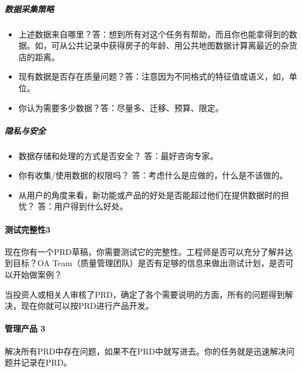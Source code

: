 \documentclass[letterpaper,11pt,english]{sphinxmanual}
\begin{document}
\subparagraph{数据采集策略}
\label{\detokenize{chapter_knowledge/PRD:id23}}\begin{itemize}
\item {} 
上述数据来自哪里？答：想到所有对这个任务有帮助，而且你也能拿得到的数据。如，可从公共记录中获得房子的年龄、用公共地图数据计算离最近的杂货店的距离。

\item {} 
现有数据是否存在质量问题？答：注意因为不同格式的特征值或语义，如，单位。

\item {} 
你认为需要多少数据？答：尽量多、迁移、预算、限定。

\end{itemize}


\subparagraph{隐私与安全}
\label{\detokenize{chapter_knowledge/PRD:id24}}\begin{itemize}
\item {} 
数据存储和处理的方式是否安全？ 答：最好咨询专家。

\item {} 
你有收集/使用数据的权限吗？ 答：考虑什么是应做的，什么是不该做的。

\item {} 
从用户的角度来看，新功能或产品的好处是否能超过他们在提供数据时的担忧？
答：用户得到什么好处。

\end{itemize}


\paragraph{测试完整性3\sphinxfootnotemark[496]}
\label{\detokenize{chapter_knowledge/PRD:id25}}%
\begin{footnotetext}[496]\sphinxAtStartFootnote
{}
%
\end{footnotetext}\ignorespaces 
现在你有一个PRD草稿，你需要测试它的完整性。工程师是否可以充分了解并达到目标？OA
Team（质量管理团队）是否有足够的信息来做出测试计划，是否可以开始做案例？

当投资人或相关人审核了PRD，确定了各个需要说明的方面，所有的问题得到解决，现在你就可以按PRD进行产品开发。


\paragraph{管理产品 3\sphinxfootnotemark[497]}
\label{\detokenize{chapter_knowledge/PRD:id26}}%
\begin{footnotetext}[497]\sphinxAtStartFootnote
{}
%
\end{footnotetext}\ignorespaces 
解决所有PRD中存在问题，如果不在PRD中就写进去。你的任务就是迅速解决问题并记录在PRD。
\end{document}
